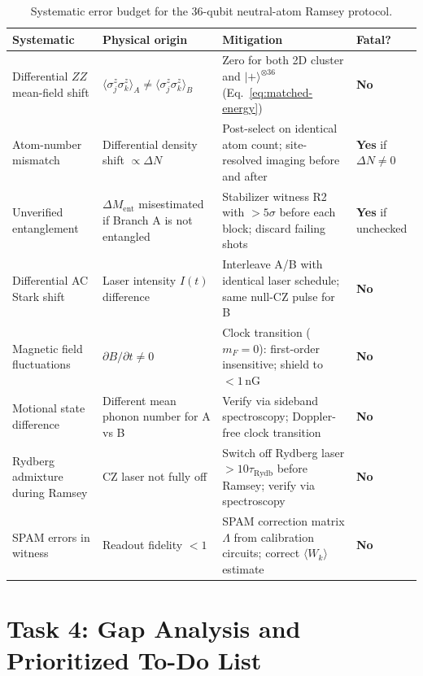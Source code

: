 \documentclass[12pt,letterpaper]{article}
\theoremstyle{plain}
\theoremstyle{definition}
\begin{document}
\begin{table}[h]
\centering\small
\caption{Systematic error budget for the 36-qubit neutral-atom Ramsey protocol.}
\label{tab:systematics}
\begin{tabular}{@{}p{3.8cm}p{2.8cm}p{4.0cm}p{2.0cm}@{}}
\toprule
Systematic & Physical origin & Mitigation & Fatal? \\
\midrule
Differential $ZZ$ mean-field shift & $\langle\sigma^z_j\sigma^z_k\rangle_{A}\neq\langle\sigma^z_j\sigma^z_k\rangle_{B}$ & Zero for both 2D cluster and $|+\rangle^{\otimes 36}$ (Eq.~\ref{eq:matched-energy}) & \textbf{No} \\
\addlinespace
Atom-number mismatch & Differential density shift $\propto\Delta N$ & Post-select on identical atom count; site-resolved imaging before and after & \textbf{Yes} if $\Delta N \neq 0$ \\
\addlinespace
Unverified entanglement & $\Delta M_{\mathrm{ent}}$ misestimated if Branch A is not entangled & Stabilizer witness R2 with $>5\sigma$ before each block; discard failing shots & \textbf{Yes} if unchecked \\
\addlinespace
Differential AC Stark shift & Laser intensity $I(t)$ difference & Interleave A/B with identical laser schedule; same null-CZ pulse for B & \textbf{No} \\
\addlinespace
Magnetic field fluctuations & $\partial B/\partial t \neq 0$ & Clock transition ($m_F=0$): first-order insensitive; shield to $<1$\,nG & \textbf{No} \\
\addlinespace
Motional state difference & Different mean phonon number for A vs B & Verify via sideband spectroscopy; Doppler-free clock transition & \textbf{No} \\
\addlinespace
Rydberg admixture during Ramsey & CZ laser not fully off & Switch off Rydberg laser $>10\tau_{\mathrm{Rydb}}$ before Ramsey; verify via spectroscopy & \textbf{No} \\
\addlinespace
SPAM errors in witness & Readout fidelity $<1$ & SPAM correction matrix $\Lambda$ from calibration circuits; correct $\langle W_k\rangle$ estimate & \textbf{No} \\
\bottomrule
\end{tabular}
\end{table}

\section{Task 4: Gap Analysis and Prioritized To-Do List}
\label{sec:gaps}
\end{document}
